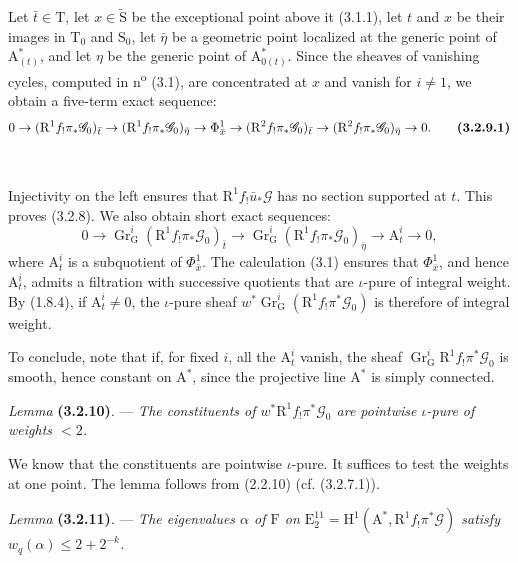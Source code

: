 \documentclass[11pt,leqno]{article}
\newcommand{\Page}[1]{\ifvmode\noindent\else\unskip\ \fi{\footnotesize\textcolor{gray}{[p.\,#1]}}\ \ignorespaces}
\begin{document}
Let \(\bar{t}\in\mathrm{T}\), let \(x\in\widetilde{\mathrm{S}}\) be the exceptional point above it (3.1.1), let \(t\) and \(x\) be their images in \(\mathrm{T}_0\) and \(\mathrm{S}_0\), let \(\bar{\eta}\) be a geometric point localized at the generic point of \(\mathrm{A}_{(t)}^*\), and let \(\eta\) be the generic point of \(\mathrm{A}_{0(t)}^*\). Since the sheaves of vanishing cycles, computed in n\textsuperscript{o} (3.1), are concentrated at \(x\) and vanish for \(i\neq1\), we obtain a five-term exact sequence:
\[
0\to(\mathrm{R}^1f_!\pi_*\mathscr{G}_0)_{\bar{t}}
\to(\mathrm{R}^1f_!\pi_*\mathscr{G}_0)_{\bar{\eta}}
\to\Phi_{\bar{x}}^1
\to(\mathrm{R}^2f_!\pi_*\mathscr{G}_0)_{\bar{t}}
\to(\mathrm{R}^2f_!\pi_*\mathscr{G}_0)_{\bar{\eta}}\to0.
\tag*{\textbf{(3.2.9.1)}}
\]

\Page{203}

Injectivity on the left ensures that \(\mathrm{R}^1f_!\bar{u}_*\mathscr{G}\) has no section supported at \(t\). This proves (3.2.8). We also obtain short exact sequences:
\[
0\to\operatorname{Gr}_{\mathrm{G}}^i
(\mathrm{R}^1f_!\pi_*\mathscr{G}_0)_{\bar{t}}
\to\operatorname{Gr}_{\mathrm{G}}^i
(\mathrm{R}^1f_!\pi_*\mathscr{G}_0)_{\bar{\eta}}
\to\mathrm{A}_t^i\to0,
\]
where \(\mathrm{A}_t^i\) is a subquotient of \(\Phi_{\bar{x}}^1\). The calculation (3.1) ensures that \(\Phi_{\bar{x}}^1\), and hence \(\mathrm{A}_t^i\), admits a filtration with successive quotients that are \(\iota\)-pure of integral weight. By (1.8.4), if \(\mathrm{A}_t^i\neq0\), the \(\iota\)-pure sheaf \(w^*\operatorname{Gr}_{\mathrm{G}}^i(\mathrm{R}^1f_!\pi^*\mathscr{G}_0)\) is therefore of integral weight.

To conclude, note that if, for fixed \(i\), all the \(\mathrm{A}_t^i\) vanish, the sheaf \(\operatorname{Gr}_{\mathrm{G}}^i\mathrm{R}^1f_!\pi^*\mathscr{G}_0\) is smooth, hence constant on \(\mathrm{A}^*\), since the projective line \(\mathrm{A}^*\) is simply connected.

\textit{Lemma} \textbf{(3.2.10)}. — \textit{The constituents of \(w^*\mathrm{R}^1f_!\pi^*\mathscr{G}_0\) are pointwise \(\iota\)-pure of weights \(<2\).}

We know that the constituents are pointwise \(\iota\)-pure. It suffices to test the weights at one point. The lemma follows from (2.2.10) (cf. (3.2.7.1)).

\textit{Lemma} \textbf{(3.2.11)}. — \textit{The eigenvalues \(\alpha\) of \(\mathrm{F}\) on \(\mathrm{E}_2^{11}=\mathrm{H}^1(\mathrm{A}^*,\mathrm{R}^1f_!\pi^*\mathscr{G})\) satisfy \(w_q(\alpha)\leq2+2^{-k}\).}
\end{document}
